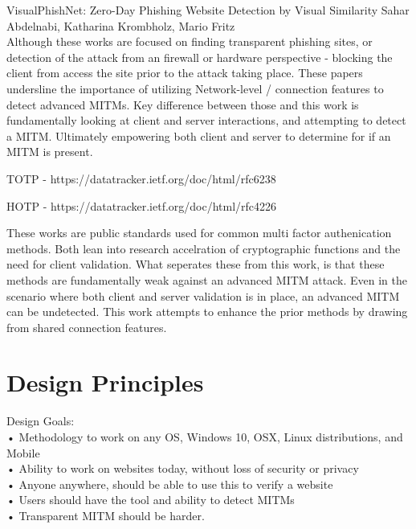 \documentclass[a4paper, 11pt]{article} 				%
\begin{document}
\noindent
[19]VisualPhishNet: Zero-Day Phishing Website Detection by Visual Similarity
Sahar Abdelnabi, Katharina Krombholz, Mario Fritz\\

Although these works are focused on finding transparent phishing sites, or detection of the attack from an firewall or hardware perspective - blocking the client from access the site prior to the attack taking place. These papers undersline the importance of utilizing Network-level / connection features to detect advanced MITMs. Key difference between those and this work is fundamentally looking at client and server interactions, and attempting to detect a MITM. Ultimately empowering both client and server to determine for if an MITM is present. 

\noindent
[7]TOTP - https://datatracker.ietf.org/doc/html/rfc6238

\noindent
[8]HOTP - https://datatracker.ietf.org/doc/html/rfc4226 

These works are public standards used for common multi factor authenication methods. Both lean into research accelration of cryptographic functions and the need for client validation. What seperates these from this work, is that these methods are fundamentally weak against an advanced MITM attack. Even in the scenario where both client and server validation is in place, an advanced MITM can be undetected. This work attempts to enhance the prior methods by drawing from shared connection features.

\section{Design Principles}
\noindent	%
Design Goals:\\
• Methodology to work on any OS, Windows 10, OSX, Linux distributions, and Mobile\\
• Ability to work on websites today, without loss of security or privacy\\
• Anyone anywhere, should be able to use this to verify a website\\
• Users should have the tool and ability to detect MITMs\\
• Transparent MITM should be harder.\\
\end{document}
